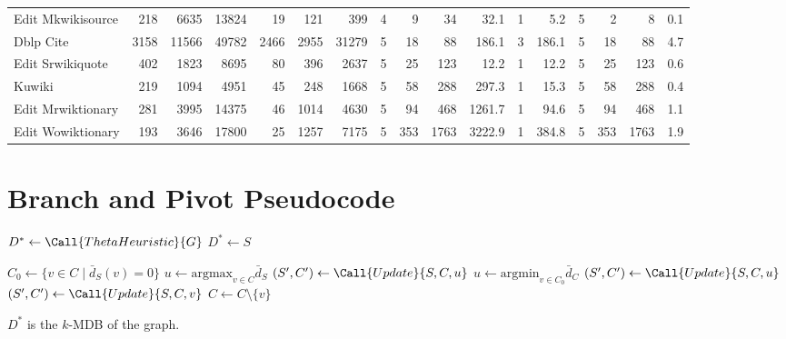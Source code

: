 \documentclass{article}
\begin{document}
\begin{landscape}
\begin{table}[htbp]
\begin{tabular}{l *{16}{r}}
        Edit Mkwikisource & 218 & 6635 & 13824 & 19 & 121 & 399 & 4 & 9 & 34 & 32.1 & 1 & 5.2 & 5 & 2 & 8 & 0.1 \\
        Dblp Cite & 3158 & 11566 & 49782 & 2466 & 2955 & 31279 & 5 & 18 & 88 & 186.1 & 3 & 186.1 & 5 & 18 & 88 & 4.7 \\
        Edit Srwikiquote & 402 & 1823 & 8695 & 80 & 396 & 2637 & 5 & 25 & 123 & 12.2 & 1 & 12.2 & 5 & 25 & 123 & 0.6 \\
        Kuwiki & 219 & 1094 & 4951 & 45 & 248 & 1668 & 5 & 58 & 288 & 297.3 & 1 & 15.3 & 5 & 58 & 288 & 0.4 \\
        Edit Mrwiktionary & 281 & 3995 & 14375 & 46 & 1014 & 4630 & 5 & 94 & 468 & 1261.7 & 1 & 94.6 & 5 & 94 & 468 & 1.1 \\
        Edit Wowiktionary & 193 & 3646 & 17800 & 25 & 1257 & 7175 & 5 & 353 & 1763 & 3222.9 & 1 & 384.8 & 5 & 353 & 1763 & 1.9 \\
        \bottomrule
      \end{tabular}
    \end{table}
    \end{landscape}
    
\section{Branch and Pivot Pseudocode}

\begin{algorithm}[H]
\caption{Branch and Pivot}
\begin{minipage}{\textwidth}
\begin{algorithmic}
\State $D^* \gets \Call{ThetaHeuristic}{G}$
                \State $D^* \gets S$
                \State \Return
            \EndIf
        \EndIf

        \State $C_0 \gets \{v \in C \mid \bar{d}_S(v) = 0\}$
            \State $u \gets \text{argmax}_{v \in C}{\bar{d}_S}$
            \State $(S^\prime, C^\prime) \gets \Call{Update}{S, C, u}$
            \State {}
            \State {}
        \Else
            \State $u \gets \text{argmin}_{v \in C_0}\bar{d}_C$
                \State $(S^\prime, C^\prime) \gets \Call{Update}{S, C, u}$
                \State {}
                \State {}
            \Else
                    \State $(S^\prime, C^\prime) \gets \Call{Update}{S, C, v}$
                    \State {}
                    \State $C \gets C \setminus \{v\}$
                \EndFor
            \EndIf
        \EndIf
    \EndFunction
\end{algorithmic}
\end{minipage}
\end{algorithm}

$D^*$ is the $k$-MDB of the graph.
\end{document}

